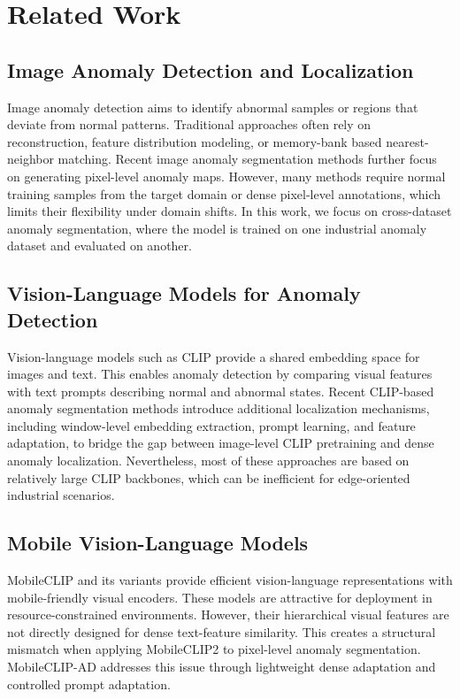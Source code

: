 \documentclass[10pt]{article}
\begin{document}
\section{Related Work}

\subsection{Image Anomaly Detection and Localization}
Image anomaly detection aims to identify abnormal samples or regions that deviate from normal patterns. Traditional approaches often rely on reconstruction, feature distribution modeling, or memory-bank based nearest-neighbor matching. Recent image anomaly segmentation methods further focus on generating pixel-level anomaly maps. However, many methods require normal training samples from the target domain or dense pixel-level annotations, which limits their flexibility under domain shifts. In this work, we focus on cross-dataset anomaly segmentation, where the model is trained on one industrial anomaly dataset and evaluated on another.

\subsection{Vision-Language Models for Anomaly Detection}
Vision-language models such as CLIP provide a shared embedding space for images and text. This enables anomaly detection by comparing visual features with text prompts describing normal and abnormal states. Recent CLIP-based anomaly segmentation methods introduce additional localization mechanisms, including window-level embedding extraction, prompt learning, and feature adaptation, to bridge the gap between image-level CLIP pretraining and dense anomaly localization. Nevertheless, most of these approaches are based on relatively large CLIP backbones, which can be inefficient for edge-oriented industrial scenarios.

\subsection{Mobile Vision-Language Models}
MobileCLIP and its variants provide efficient vision-language representations with mobile-friendly visual encoders. These models are attractive for deployment in resource-constrained environments. However, their hierarchical visual features are not directly designed for dense text-feature similarity. This creates a structural mismatch when applying MobileCLIP2 to pixel-level anomaly segmentation. MobileCLIP-AD addresses this issue through lightweight dense adaptation and controlled prompt adaptation.
\end{document}
